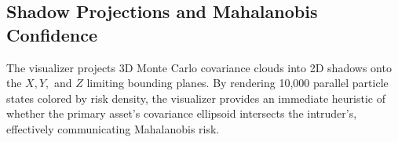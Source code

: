 \subsection{Shadow Projections and Mahalanobis Confidence}
The visualizer projects 3D Monte Carlo covariance clouds into 2D shadows onto the $X, Y,$ and $Z$ limiting bounding planes. By rendering 10,000 parallel particle states colored by risk density, the visualizer provides an immediate heuristic of whether the primary asset's covariance ellipsoid intersects the intruder's, effectively communicating Mahalanobis risk.
